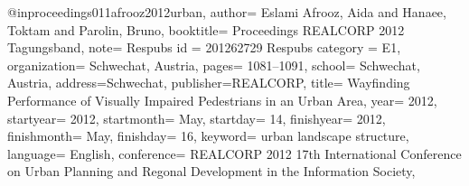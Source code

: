 @inproceedings{011afrooz2012urban, 
author= {Eslami Afrooz, Aida and Hanaee, Toktam and Parolin, Bruno}, 
booktitle= {Proceedings REALCORP 2012 Tagungsband}, 
note= {Respubs id = 201262729 Respubs category = E1}, 
organization= {Schwechat, Austria}, 
pages= {1081--1091}, 
school= {Schwechat, Austria}, 
address={Schwechat},
publisher={REALCORP},
title= {Wayfinding Performance of Visually Impaired Pedestrians in an Urban Area},
year= {2012}, 
startyear= {2012}, 
startmonth= {May}, 
startday= {14}, 
finishyear= {2012}, 
finishmonth= {May}, 
finishday= {16}, 
keyword= {urban landscape structure}, 
language= {English}, 
conference= {REALCORP 2012 17th International Conference on Urban Planning and Regonal Development in the Information Society},}
